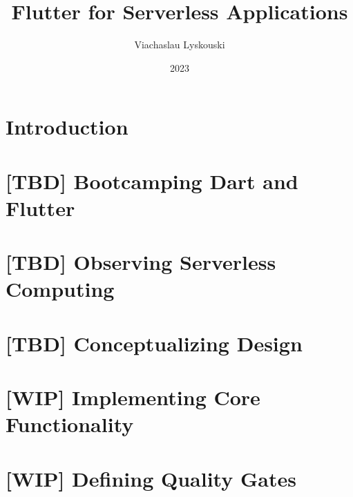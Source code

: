\documentclass[12pt, a4paper, twoside]{extreport}
\author{Viachaslau Lyskouski}
\title{Flutter for Serverless Applications}
\date{2023}
\begin{document}


\maketitle

%

\tableofcontents



\newpage
\section*{Introduction}


\newpage
\section{[TBD] Bootcamping Dart and Flutter}





\newpage
\section{[TBD] Observing Serverless Computing}


\newpage
\section{[TBD] Conceptualizing Design}


\newpage
\section{[WIP] Implementing Core Functionality}






\newpage
\section{[WIP] Defining Quality Gates}





\end{document}
